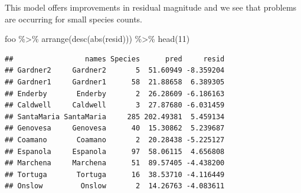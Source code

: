 \documentclass[
  ignorenonframetext,
]{beamer}
\newenvironment{Shaded}{\begin{snugshade}}{\end{snugshade}}
\newcommand{\DecValTok}[1]{\textcolor[rgb]{0.00,0.00,0.81}{#1}}
\newcommand{\FunctionTok}[1]{\textcolor[rgb]{0.00,0.00,0.00}{#1}}
\newcommand{\NormalTok}[1]{#1}
\newcommand{\SpecialCharTok}[1]{\textcolor[rgb]{0.00,0.00,0.00}{#1}}
\begin{document}
\begin{frame}[fragile]{}
\protect\hypertarget{section-26}{}
This model offers improvements in residual magnitude and we see that
problems are occurring for small species counts.

\vspace{12pt}
\tiny

\begin{Shaded}
\begin{Highlighting}[]
\NormalTok{foo }\SpecialCharTok{\%\textgreater{}\%} \FunctionTok{arrange}\NormalTok{(}\FunctionTok{desc}\NormalTok{(}\FunctionTok{abs}\NormalTok{(resid))) }\SpecialCharTok{\%\textgreater{}\%} \FunctionTok{head}\NormalTok{(}\DecValTok{11}\NormalTok{)}
\end{Highlighting}
\end{Shaded}

\begin{verbatim}
##                 names Species      pred     resid
## Gardner2     Gardner2       5  51.60949 -8.359204
## Gardner1     Gardner1      58  21.88658  6.389305
## Enderby       Enderby       2  26.28609 -6.186163
## Caldwell     Caldwell       3  27.87680 -6.031459
## SantaMaria SantaMaria     285 202.49381  5.459134
## Genovesa     Genovesa      40  15.30862  5.239687
## Coamano       Coamano       2  20.28438 -5.225127
## Espanola     Espanola      97  58.06115  4.656808
## Marchena     Marchena      51  89.57405 -4.438200
## Tortuga       Tortuga      16  38.53710 -4.116449
## Onslow         Onslow       2  14.26763 -4.083611
\end{verbatim}

\begin{Shaded}
\end{Shaded}


\end{frame}
\end{document}

